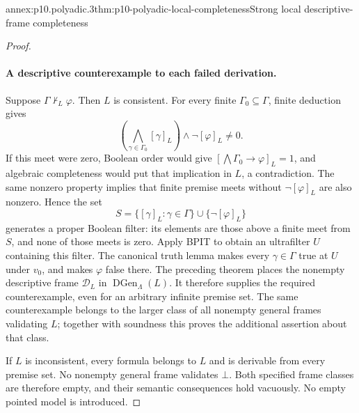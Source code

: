 \begin{annexitem}{annex:p10.polyadic.3}{thm:p10-polyadic-local-completeness}{Strong local descriptive-frame completeness}
\begin{proof}
\paragraph{A descriptive counterexample to each failed derivation.}
Suppose \(\Gamma\not\vdash_L\varphi\).  Then \(L\) is consistent.
For every finite \(\Gamma_0\subseteq\Gamma\), finite deduction gives
\[
 \left(\bigwedge_{\gamma\in\Gamma_0}[\gamma]_L\right)
                                  \wedge\neg[\varphi]_L\ne0.
\]
If this meet were zero, Boolean order would give
\([\bigwedge\Gamma_0\to\varphi]_L=1\), and algebraic
completeness would put that implication in \(L\), a contradiction.
The same nonzero property implies that finite premise meets without
\(\neg[\varphi]_L\) are also nonzero.
Hence the set
\[
 S=\{[\gamma]_L:\gamma\in\Gamma\}\cup\{\neg[\varphi]_L\}
\]
generates a proper Boolean filter: its elements are those above a
finite meet from \(S\), and none of those meets is zero.
Apply BPIT to obtain an ultrafilter \(U\) containing this filter.
The canonical truth lemma makes every \(\gamma\in\Gamma\) true
at \(U\) under \(v_0\), and makes \(\varphi\) false there.
The preceding theorem places the nonempty descriptive frame
\(\mathcal D_L\) in \(\operatorname{DGen}_\Lambda(L)\).
It therefore supplies the required counterexample, even for an
arbitrary infinite premise set.
The same counterexample belongs to the larger class of all
nonempty general frames validating \(L\); together with soundness
this proves the additional assertion about that class.

If \(L\) is inconsistent, every formula belongs to \(L\) and is
derivable from every premise set.  No nonempty general frame
validates \(\bot\).  Both specified frame classes are therefore
empty, and their semantic consequences hold vacuously.
No empty pointed model is introduced.
\end{proof}
\end{annexitem}
